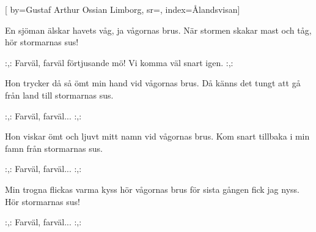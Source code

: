 


[ 	%
	by={Gustaf Arthur Ossian Limborg},	%
	sr={},		%
	index={Ålandsvisan}]		%
	
\beginverse*		%
En sjöman älskar havets våg, 
ja vågornas brus.
När stormen skakar mast och tåg, 
hör stormarnas sus!
\endverse			%

\beginchorus
:,: Farväl, farväl förtjusande mö! 
Vi komma väl snart igen. :,:
\endchorus

\beginverse*		%
Hon trycker då så ömt min hand 
vid vågornas brus.
Då känns det tungt att gå från land 
till stormarnas sus.
\endverse			%

\beginchorus
:,: Farväl, farväl... :,:
\endchorus

\beginverse*		%
Hon viskar ömt och ljuvt mitt namn 
vid vågornas brus.
Kom snart tillbaka i min famn 
från stormarnas sus.
\endverse			%

\beginchorus
:,: Farväl, farväl... :,:
\endchorus

\beginverse*		%
Min trogna flickas varma kyss 
hör vågornas brus 
för sista gången fick jag nyss. 
Hör stormarnas sus!
\endverse			%

\beginchorus
:,: Farväl, farväl... :,:
\endchorus
\endsong			%
